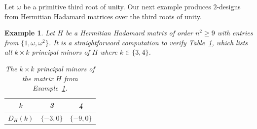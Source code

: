 \documentclass[11pt]{article}
\newtheorem{example}[theorem]{Example}
\begin{document}
Let $\omega$ be a primitive third root of unity.
Our next example produces $2$-designs from Hermitian Hadamard matrices over the third roots of unity.

\begin{example}
\label{ex:herm}
Let $H$ be a Hermitian Hadamard matrix of order $n^2 \geqslant 9$ with entries from $\{1,\omega,\omega^2\}$. %
It is a straightforward computation to verify Table~\ref{tab:hermMinors}, which lists all $k \times k$ principal minors of $H$ where $k \in \{3,4\}$.
\begin{table}[h!]
\label{tab:hermMinors}
\centering
        \begin{tabular}{c|c|c}
        $k$ &  3 & 4  \\
        \hline
        $D_{H}(k)$ & $\{-3,0\}$ & $\{-9,0\}$  \\
    \end{tabular}
    \caption{The $k\times k$ principal minors of the matrix $H$ from Example~\ref{ex:herm}.}
\end{table}


\end{example}
\end{document}
